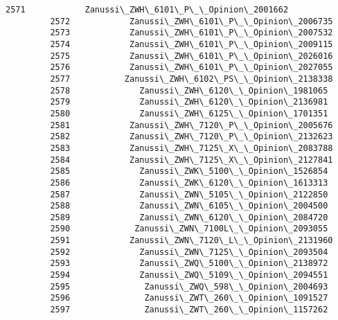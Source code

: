 \documentclass{article}
\begin{document}
\begin{Verbatim}[commandchars=\\\{\}]
         2571            Zanussi\_ZWH\_6101\_P\_\_Opinion\_2001662   
         2572            Zanussi\_ZWH\_6101\_P\_\_Opinion\_2006735   
         2573            Zanussi\_ZWH\_6101\_P\_\_Opinion\_2007532   
         2574            Zanussi\_ZWH\_6101\_P\_\_Opinion\_2009115   
         2575            Zanussi\_ZWH\_6101\_P\_\_Opinion\_2026016   
         2576            Zanussi\_ZWH\_6101\_P\_\_Opinion\_2027055   
         2577           Zanussi\_ZWH\_6102\_PS\_\_Opinion\_2138338   
         2578              Zanussi\_ZWH\_6120\_\_Opinion\_1981065   
         2579              Zanussi\_ZWH\_6120\_\_Opinion\_2136981   
         2580              Zanussi\_ZWH\_6125\_\_Opinion\_1701351   
         2581            Zanussi\_ZWH\_7120\_P\_\_Opinion\_2005676   
         2582            Zanussi\_ZWH\_7120\_P\_\_Opinion\_2132623   
         2583            Zanussi\_ZWH\_7125\_X\_\_Opinion\_2083788   
         2584            Zanussi\_ZWH\_7125\_X\_\_Opinion\_2127841   
         2585              Zanussi\_ZWK\_5100\_\_Opinion\_1526854   
         2586              Zanussi\_ZWK\_6120\_\_Opinion\_1613313   
         2587              Zanussi\_ZWN\_5105\_\_Opinion\_2122850   
         2588              Zanussi\_ZWN\_6105\_\_Opinion\_2004500   
         2589              Zanussi\_ZWN\_6120\_\_Opinion\_2084720   
         2590             Zanussi\_ZWN\_7100L\_\_Opinion\_2093055   
         2591            Zanussi\_ZWN\_7120\_L\_\_Opinion\_2131960   
         2592              Zanussi\_ZWN\_7125\_\_Opinion\_2093504   
         2593              Zanussi\_ZWQ\_5100\_\_Opinion\_2138972   
         2594              Zanussi\_ZWQ\_5109\_\_Opinion\_2094551   
         2595               Zanussi\_ZWQ\_598\_\_Opinion\_2004693   
         2596               Zanussi\_ZWT\_260\_\_Opinion\_1091527   
         2597               Zanussi\_ZWT\_260\_\_Opinion\_1157262   
         

\end{Verbatim}
\end{document}
